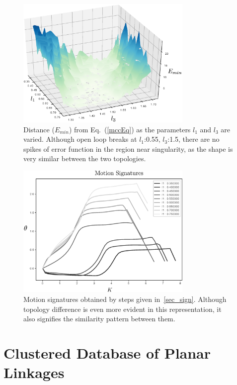 \documentclass[twocolumn,10pt]{asme2ej}
\newcommand{\req}[1]{(\ref{#1})}
\begin{document}
\begin{figure}
\centering
\includegraphics[width=240pt]{figure/fig_sa_distance_function.eps}
  \caption{Distance ($E_{min}$) from Eq.~\req{mccEq} as the parameters $l_1$ and $l_3$ are varied. Although open loop breaks at $l_1$:0.55, $l_3$:1.5, there are no spikes of error function in the region near singularity, as the shape is very similar between the two topologies.}
\label{saErrorFunction}
\end{figure}

\begin{figure}
\centering
\includegraphics[width=240pt]{figure/fig_sa_motion_signatures.eps}
  \caption{Motion signatures obtained by steps given in~\ref{sec_sign}. Although topology difference is even more evident in this representation, it also signifies the similarity pattern between them.}
\label{saMotionSignatures}
\end{figure}

\section{Clustered Database of Planar Linkages}\label{sec_db_ae}
\end{document}
